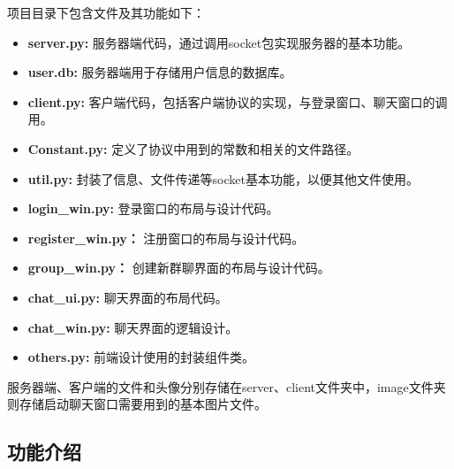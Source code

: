 \documentclass[12pt]{article} %
\begin{document}
\begin{sloppypar}
项目目录下包含文件及其功能如下：
\begin{itemize}
	\item {\bf server.py:} 服务器端代码，通过调用socket包实现服务器的基本功能。\vspace*{-1.5mm}
	\item {\bf user.db:} 服务器端用于存储用户信息的数据库。\vspace*{-1.5mm}
	\item {\bf client.py:} 客户端代码，包括客户端协议的实现，与登录窗口、聊天窗口的调用。\vspace*{-1.5mm}
	\item {\bf Constant.py:} 定义了协议中用到的常数和相关的文件路径。\vspace*{-1.5mm}
	\item {\bf util.py:} 封装了信息、文件传递等socket基本功能，以便其他文件使用。\vspace*{-1.5mm}
	\item {\bf login\_win.py:} 登录窗口的布局与设计代码。\vspace*{-1.5mm}
	\item {\bf register\_win.py：} 注册窗口的布局与设计代码。\vspace*{-1.5mm}
	\item {\bf group\_win.py：} 创建新群聊界面的布局与设计代码。\vspace*{-1.5mm}
	\item {\bf chat\_ui.py:} 聊天界面的布局代码。\vspace*{-1.5mm}
	\item {\bf chat\_win.py:} 聊天界面的逻辑设计。\vspace*{-1.5mm}
	\item {\bf others.py:} 前端设计使用的封装组件类。\vspace*{-1.5mm}
\end{itemize}

服务器端、客户端的文件和头像分别存储在server、client文件夹中，image文件夹则存储启动聊天窗口需要用到的基本图片文件。

\subsection{功能介绍}


\end{sloppypar}
\end{document}
